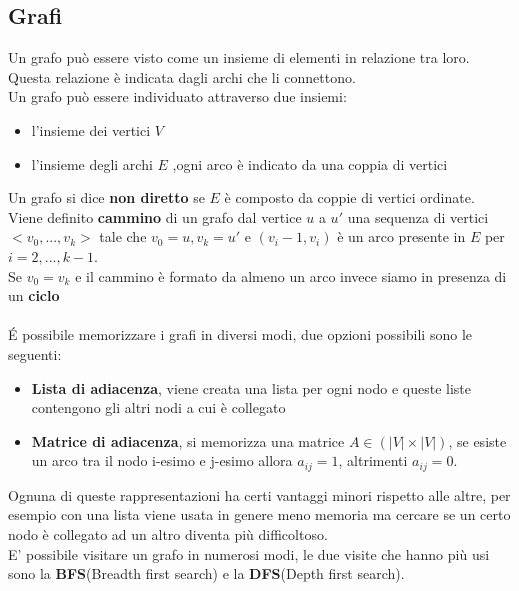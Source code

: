 \documentclass[]{article}
\begin{document}
\subsection{Grafi}
Un grafo può essere visto come un insieme di elementi in relazione tra loro.\\
Questa relazione è indicata dagli archi che li connettono.\\
Un grafo può essere individuato attraverso due insiemi:
\begin{itemize}
\item l'insieme dei vertici $V$
\item l'insieme degli archi $E$ ,ogni arco è indicato da una coppia di vertici
\end{itemize}
Un grafo si dice \textbf{non diretto} se $E$ è composto da coppie di vertici ordinate.\\
Viene definito \textbf{cammino} di un grafo dal vertice $u$ a $u'$ una sequenza di vertici $<v_0, ... , v_k>$ tale che $v_0 = u,v_k=u'$ e $(v_i-1, v_i)$ è un arco presente in $E$ per $i = 2,..., k-1$.\\
Se $v_0 = v_k$ e il cammino è formato da almeno un arco invece siamo in presenza di un \textbf{ciclo}
\\\\
\'E possibile memorizzare i grafi in diversi modi, due opzioni possibili sono le seguenti:
\begin{itemize}
\item \textbf{Lista di adiacenza}, viene creata una lista per ogni nodo e queste liste contengono gli altri nodi a cui è collegato
\item \textbf{Matrice di adiacenza}, si memorizza una matrice $A \in (|V| \times |V|)$, se esiste un arco tra il nodo i-esimo e j-esimo allora $a_{ij} = 1$, altrimenti $a_{ij} = 0$. 
\end{itemize}
Ognuna di queste rappresentazioni ha certi vantaggi minori rispetto alle altre, per esempio con una lista viene usata in genere meno memoria ma cercare se un certo nodo è collegato ad un altro diventa più difficoltoso.\\ 
E' possibile visitare un grafo in numerosi modi, le due visite che hanno più usi sono la \textbf{BFS}(Breadth first search) e la \textbf{DFS}(Depth first search).\\
\end{document}
